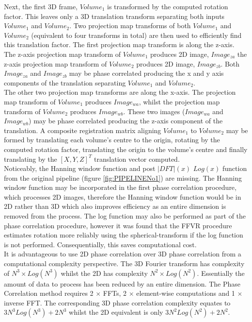 Next, the first 3D frame, $Volume_1$ is transformed by the computed rotation factor. This leaves only a 3D translation transform separating both inputs $Volume_1$ and $Volume_2$. Two projection map transforms of both $Volume_1$ and $Volume_2$ (equivalent to four transforms in total) are then used to efficiently find this translation factor. The first projection map transform is along the z-axis. The z-axis projection map transform of $Volume_1$ produces 2D image, $Image_{za}$ the z-axis projection map transform of $Volume_2$ produces 2D image, $Image_{zb}$. Both $Image_{za}$ and $Image_{zb}$ may be phase correlated producing the x and y axis components of the translation separating $Volume_1$ and $Volume_2$. \\

The other two projection map transforms are along the x-axis. The projection map transform of $Volume_1$ produces $Image_{wa}$, whilst the projection map transform of $Volume_2$ produces $Image_{wb}$. These two images ($Image_{wa}$ and $Image_{wb}$) may be phase correlated producing the z-axis component of the translation. A composite registration matrix aligning $Volume_1$ to $Volume_2$ may be formed by translating each volume's centre to the origin, rotating by the computed rotation factor, translating the origin to the volume's centre and finally translating by the $[X,Y,Z]^T$ translation vector computed. \\

Noticeably, the Hanning window function and post $|DFT|(x)$ $Log(x)$ function from the original pipeline (figure \ref{fig:PIPELINENo1}) are missing. The Hanning window function may be incorporated in the first phase correlation procedure, which processes 2D images, therefore the Hanning window function would be in 2D rather than 3D which also improves efficiency as an entire dimension is removed from the process. The log function may also be performed as part of the phase correlation procedure, however it was found that the FFVR procedure estimates rotation more reliably using the spherical-transform if the log function is not performed. Consequentially, this saves computational cost. \\

It is advantageous to use 2D phase correlation over 3D phase correlation from a computational complexity perspective. The 3D Fourier transform has complexity of $N^3 \times Log(N^3)$ whilst the 2D has complexity $N^2 \times Log(N^2)$. Essentially the amount of data to process has been reduced by an entire dimension. The Phase Correlation method requires 2 $\times$ FFTs, 2 $\times$ element-wise computations and 1 $\times$ inverse FFT. The corresponding 3D phase correlation complexity equates to $3N^3Log(N^3) + 2N^3$ whilst the 2D equivalent is only $3N^2Log(N^2) + 2N^2$. \\ 

